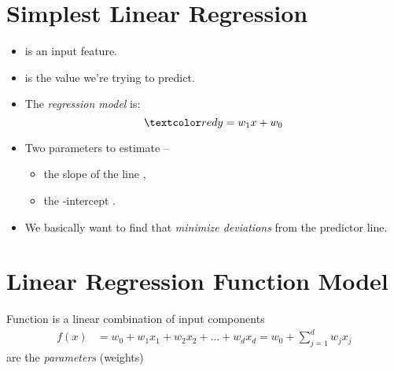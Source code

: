 \documentclass[
	title={Linear Regression}
]{cs584notes}
\begin{document}
\section{Simplest Linear Regression}\label{sec:simplest-linear-regression}
\begin{itemize}
	\item {} is an input feature.
	\item {} is the value we're trying to predict.
	\item The \emph{regression model} is:
	\[ \data{ y = w_{1}x + w_{0} } \]
	\item Two parameters to estimate --
	\begin{itemize}
		\item the slope of the line ,
		\item the -intercept .
	\end{itemize}
	\item We basically want to find  that \emph{minimize deviations} from the predictor line.
\end{itemize}

\section{Linear Regression Function Model}\label{sec:linear-regression-function-model}
Function  is a linear combination of input components
\begin{equation*}
\begin{aligned}
	f(x) &= w_{0} + w_{1}x_{1} + w_{2}x_{2} + \dots + w_{d}x_{d} = w_{0} + \sum_{j=1}^{d} w_{j}x_{j}
\end{aligned}
\end{equation*}
 are the \emph{parameters} (weights)
\end{document}
